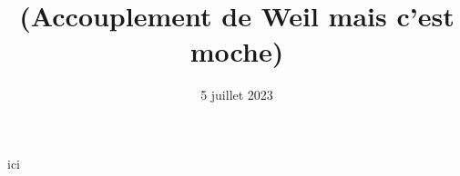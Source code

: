 \documentclass[12pt]{article}
\title{(Accouplement de Weil mais c'est moche)}
\date{5 juillet 2023}
\begin{document}
\maketitle
ici
\end{document}
